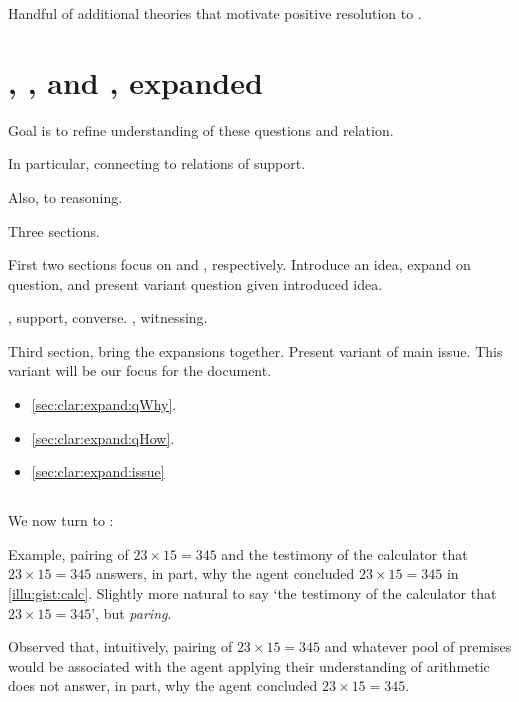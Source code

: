 \begin{note}[Motivation]
  Handful of additional theories that motivate positive resolution to \issueInclusion{}.
\end{note}

\section{\qWhy{}, \qHow{}, and \issueInclusion{}, expanded}
\label{sec:support-why-how}

\begin{note}[Goal]
  Goal is to refine understanding of these questions and relation.

  In particular, connecting \qWhy{} to relations of support.

  Also, \qHow{} to reasoning.
\end{note}

\begin{note}[Division]
  Three sections.

  First two sections focus on \qWhy{} and \qHow{}, respectively.
  Introduce an idea, expand on question, and present variant question given introduced idea.

  \qWhy{}, support, converse.
  \qHow{}, witnessing.

  Third section, bring the expansions together.
  Present variant of main issue.
  This variant will be our focus for the document.

  \begin{itemize}
  \item
    \autoref{sec:clar:expand:qWhy}.
  \item
    \autoref{sec:clar:expand:qHow}.
  \item
    \autoref{sec:clar:expand:issue}
  \end{itemize}
\end{note}

\subsection{\qWhy{}}
\label{sec:clar:expand:qWhy}

\begin{note}[Introduction]
  We now turn to \qWhy{}:
  \vspace{-\baselineskip}
  \begin{quote}
    \questionWhyBasic*
  \end{quote}
  Example, pairing of \(23 \times 15 = 345\) and the testimony of the calculator that \(23 \times 15 = 345\) answers, in part, why the agent concluded \(23 \times 15 = 345\) in \autoref{illu:gist:calc}.
  Slightly more natural to say `the testimony of the calculator that \(23 \times 15 = 345\)', but \emph{paring}.

  Observed that, intuitively, pairing of \(23 \times 15 = 345\) and whatever pool of premises would be associated with the agent applying their understanding of arithmetic does not answer, in part, why the agent concluded \(23 \times 15 = 345\).
\end{note}

